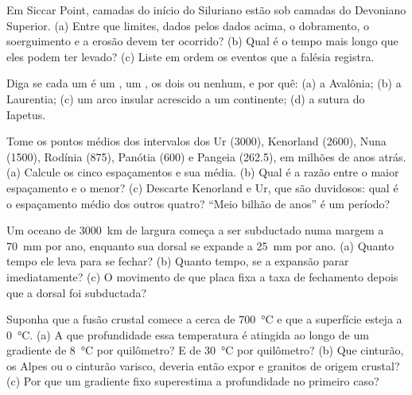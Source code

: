 \begin{exercise}[$\star$]\label{exo:b2:wilson-cycle:3}
Em Siccar Point, camadas do início do Siluriano estão sob camadas do Devoniano Superior. (a) Entre que limites,
dados pelos dados acima, o dobramento, o soerguimento e a erosão devem ter ocorrido? (b) Qual é
o tempo mais longo que eles podem ter levado? (c) Liste em ordem os eventos que a falésia registra.
\end{exercise}

\begin{exercise}[$\star$]\label{exo:b2:wilson-cycle:4}
Diga se cada um é um , um , os dois ou nenhum, e por quê: (a) a Avalônia;
(b) a Laurentia; (c) um arco insular acrescido a um continente; (d) a sutura do Iapetus.
\end{exercise}

\begin{exercise}[$\star\star$]\label{exo:b2:wilson-cycle:5}
Tome os pontos médios dos intervalos dos  Ur (3000), Kenorland (2600),
Nuna (1500), Rodínia (875), Panótia (600) e Pangeia (262.5), em milhões de anos atrás.
(a) Calcule os cinco espaçamentos e sua média. (b) Qual é a razão entre o maior espaçamento e
o menor? (c) Descarte Kenorland e Ur, que são duvidosos: qual é o espaçamento médio dos
outros quatro? ``Meio bilhão de anos'' é um período?
\end{exercise}

\begin{exercise}[$\star\star$]\label{exo:b2:wilson-cycle:6}
Um oceano de \qty{3000}{km} de largura começa a ser subductado numa margem a \qty{70}{mm} por ano,
enquanto sua dorsal se expande a \qty{25}{mm} por ano. (a) Quanto tempo ele leva para se fechar?
(b) Quanto tempo, se a expansão parar imediatamente? (c) O movimento de que placa fixa a taxa de fechamento depois
que a dorsal foi subductada?
\end{exercise}

\begin{exercise}[$\star\star$]\label{exo:b2:wilson-cycle:7}
Suponha que a fusão crustal comece a cerca de \qty{700}{\celsius} e que a superfície esteja a
\qty{0}{\celsius}. (a) A que profundidade essa temperatura é atingida ao longo de um gradiente de
\qty{8}{\celsius} por quilômetro? E de \qty{30}{\celsius} por quilômetro? (b) Que cinturão, os
Alpes ou o cinturão varisco, deveria então expor  e granitos de origem crustal?
(c) Por que um gradiente fixo superestima a profundidade no primeiro caso?
\end{exercise}

